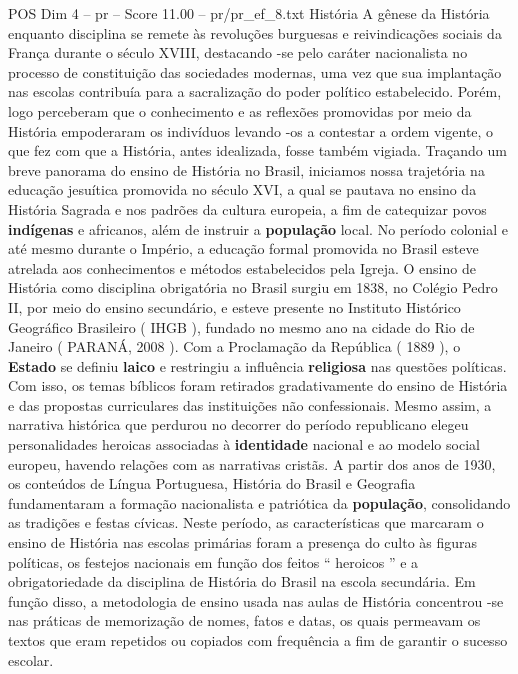 \begin{textsample}{POS Dim 4 – pr – Score 11.00 – pr/pr\_ef\_8.txt}  \label{ex:f4_pos_184}
História A gênese da História enquanto disciplina se remete às revoluções burguesas e reivindicações sociais da França durante o século XVIII, destacando -se pelo caráter nacionalista no processo de constituição das sociedades modernas, uma vez que sua implantação nas escolas contribuía para a sacralização do poder político estabelecido.
Porém, logo perceberam que o conhecimento e as reflexões promovidas por meio da História empoderaram os indivíduos levando -os a contestar a ordem vigente, o que fez com que a História, antes idealizada, fosse também vigiada.
Traçando um breve panorama do ensino de História no Brasil, iniciamos nossa trajetória na educação jesuítica promovida no século XVI, a qual se pautava no ensino da História Sagrada e nos padrões da cultura europeia, a fim de catequizar povos \textbf{indígenas} e africanos, além de instruir a \textbf{população} local.
No período colonial e até mesmo durante o Império, a educação formal promovida no Brasil esteve atrelada aos conhecimentos e métodos estabelecidos pela Igreja.
O ensino de História como disciplina obrigatória no Brasil surgiu em 1838, no Colégio Pedro II, por meio do ensino secundário, e esteve presente no Instituto Histórico Geográfico Brasileiro ( IHGB ), fundado no mesmo ano na cidade do Rio de Janeiro ( PARANÁ, 2008 ).
Com a Proclamação da República ( 1889 ), o \textbf{Estado} se definiu \textbf{laico} e restringiu a influência \textbf{religiosa} nas questões políticas.
Com isso, os temas bíblicos foram retirados gradativamente do ensino de História e das propostas curriculares das instituições não confessionais.
Mesmo assim, a narrativa histórica que perdurou no decorrer do período republicano elegeu personalidades heroicas associadas à \textbf{identidade} nacional e ao modelo social europeu, havendo relações com as narrativas cristãs.
A partir dos anos de 1930, os conteúdos de Língua Portuguesa, História do Brasil e Geografia fundamentaram a formação nacionalista e patriótica da \textbf{população}, consolidando as tradições e festas cívicas.
Neste período, as características que marcaram o ensino de História nas escolas primárias foram a presença do culto às figuras políticas, os festejos nacionais em função dos feitos “ heroicos ” e a obrigatoriedade da disciplina de História do Brasil na escola secundária.
Em função disso, a metodologia de ensino usada nas aulas de História concentrou -se nas práticas de memorização de nomes, fatos e datas, os quais permeavam os textos que eram repetidos ou copiados com frequência a fim de garantir o sucesso escolar.

\end{textsample}

